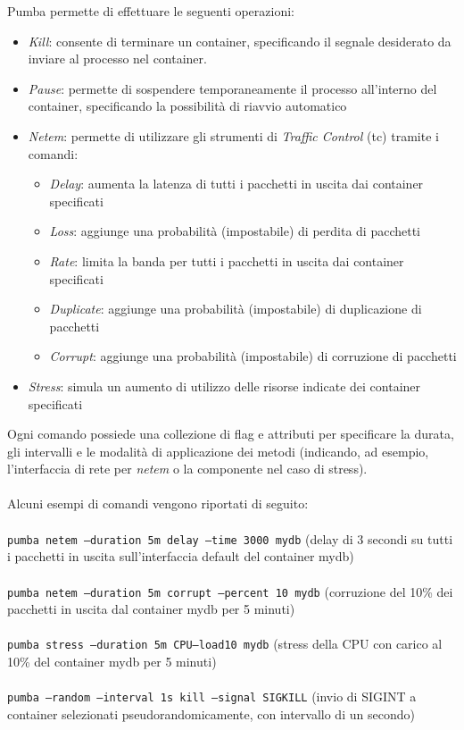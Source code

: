         Pumba permette di effettuare le seguenti operazioni: 
        \begin{itemize}
            \item \textit{Kill}: consente di terminare un container, specificando il segnale desiderato da inviare al processo nel container.
            
            \item \textit{Pause}: permette di sospendere temporaneamente il processo all'interno del container, specificando la possibilità di riavvio automatico
            
            \item \textit{Netem}: permette di utilizzare gli strumenti di \textit{Traffic Control} (tc) \cite{tc} tramite i comandi:
            \begin{itemize}
                \item \textit{Delay}: aumenta la latenza di tutti i pacchetti in uscita dai container specificati
                \item \textit{Loss}: aggiunge una probabilità (impostabile) di perdita di pacchetti
                \item\textit{ Rate}: limita la banda per tutti i pacchetti in uscita dai container specificati
                \item \textit{Duplicate}: aggiunge una probabilità (impostabile) di duplicazione di pacchetti
                \item \textit{Corrupt}: aggiunge una probabilità (impostabile) di corruzione di pacchetti
            \end{itemize}
            
            \item \textit{Stress}: simula un aumento di utilizzo delle risorse indicate dei container specificati
        \end{itemize}
       Ogni comando possiede una collezione di flag e attributi per specificare la durata, gli intervalli e le modalità di applicazione dei metodi (indicando, ad esempio, l’interfaccia di rete per \textit{netem} o la componente nel caso di stress).\\\\Alcuni esempi di comandi vengono riportati di seguito:\\\\
        \texttt{pumba netem --duration 5m delay --time 3000 mydb} (delay di 3 secondi su tutti i pacchetti in uscita sull’interfaccia default del container mydb)\\\\
        \texttt{pumba netem --duration 5m corrupt --percent 10 mydb} (corruzione del 10\% dei pacchetti in uscita dal container mydb per 5 minuti) \\\\
        \texttt{pumba stress --duration 5m CPU--load10 mydb} (stress della CPU con carico al 10\% del container mydb per 5 minuti)\\\\
        \texttt{pumba --random --interval 1s kill --signal SIGKILL} (invio di SIGINT a container selezionati pseudorandomicamente, con intervallo di un secondo)\\
    
